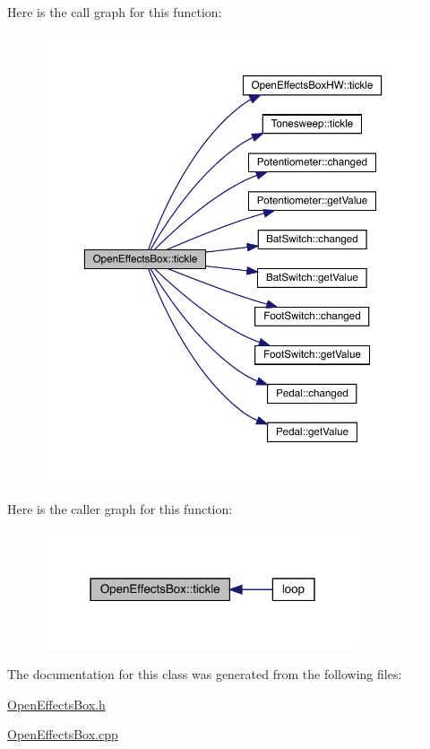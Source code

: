 Here is the call graph for this function\+:\nopagebreak
\begin{figure}[H]
\begin{center}
\leavevmode
\includegraphics[width=350pt]{class_open_effects_box_a5ce71cb124645f49096492bc37cc0603_cgraph}
\end{center}
\end{figure}
Here is the caller graph for this function\+:\nopagebreak
\begin{figure}[H]
\begin{center}
\leavevmode
\includegraphics[width=267pt]{class_open_effects_box_a5ce71cb124645f49096492bc37cc0603_icgraph}
\end{center}
\end{figure}


The documentation for this class was generated from the following files\+:\begin{DoxyCompactItemize}
\item 
\mbox{\hyperlink{_open_effects_box_8h}{Open\+Effects\+Box.\+h}}\item 
\mbox{\hyperlink{_open_effects_box_8cpp}{Open\+Effects\+Box.\+cpp}}\end{DoxyCompactItemize}
